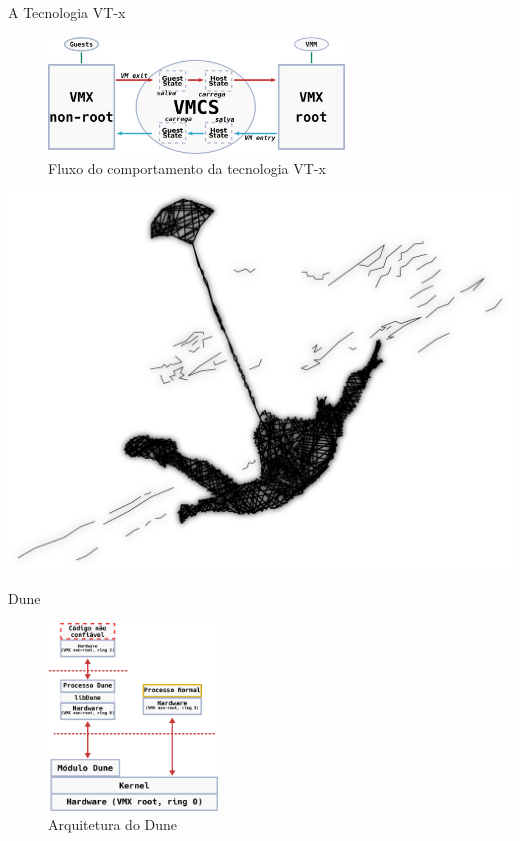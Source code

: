 \documentclass[xcolor={usenames,svgnames,dvipsnames},brazil,english,12pt,aspectratio=149]{beamer}
\begin{document}
\begin{frame}{A Tecnologia VT-x}
	\begin{figure}[!h]
		\centering
		\includegraphics[width=0.7\textwidth]{vt-x_flow} 
		\caption{Fluxo do comportamento da tecnologia VT-x}
		\label{fig:vt-x_flow}
	\end{figure}
\end{frame}

\begin{frame}[plain]
  \includegraphics[width=\textwidth]{presentation_cap2_zero}
\end{frame}

\begin{frame}{Dune}
	\begin{figure}[!h]
		\centering
		\includegraphics[width=0.4\textwidth]{dune_architecture} 
		\caption[Arquitetura do Dune]{Arquitetura do Dune}
		\label{fig:dune_architecture}
	\end{figure}
\end{frame}
\end{document}
